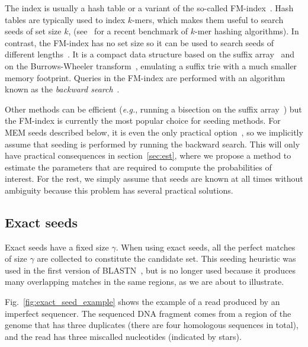 \documentclass{article}
\begin{document}
The index is usually a hash table or a variant of the so-called
FM-index~\cite{pmid20460430}. Hash tables are typically used to index
$k$-mers, which makes them useful to search seeds of set size $k$,
(see~\cite{pmid30346548} for a recent benchmark of $k$-mer hashing
algorithms). In contrast, the FM-index has no set size so it can be used
to search seeds of different lengths~\cite{ferragina2000opportunistic,
ferragina2005indexing}. It is a compact data structure based on the suffix
array~\cite{manber1993suffix} and on the Burrows-Wheeler
transform~\cite{burrows1994block}, emulating a suffix trie with a much
smaller memory footprint. Queries in the FM-index are performed with an
algorithm known as the \emph{backward
search}~\cite{ferragina2000opportunistic}.

Other methods can be efficient (\textit{e.g.}, running a bisection on the
suffix array~\cite{dobin2013star}) but the FM-index is currently the most
popular choice for seeding methods. For MEM seeds described below, it is
even the only practical option~\cite{pmid24336412, pmid25399029,
pmid23349213, pmid19389736}, so we implicitly assume that seeding is
performed by running the backward search. This will only have practical
consequences in section~\ref{sec:est}, where we propose a method to
estimate the parameters that are required to compute the probabilities of
interest. For the rest, we simply assume that seeds are known at all times
without ambiguity because this problem has several practical solutions.


\subsection{Exact seeds}

Exact seeds have a fixed size $\gamma$. When using exact seeds, all the
perfect matches of size $\gamma$ are collected to constitute the candidate
set. This seeding heuristic was used in the first version of
BLASTN~\cite{pmid2231712}, but is no longer used because it produces many
overlapping matches in the same regions, as we are about to illustrate.

Fig.~\ref{fig:exact_seed_example} shows the example of a read produced
by an imperfect sequencer. The sequenced DNA fragment comes from a region
of the genome that has three duplicates (there are four homologous
sequences in total), and the read has three miscalled nucleotides
(indicated by stars).
\end{document}
